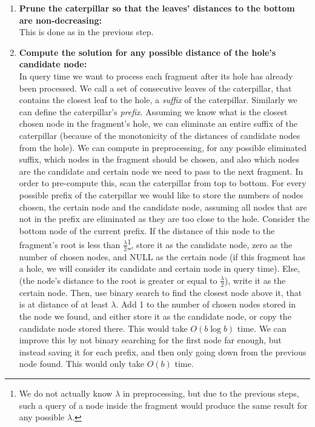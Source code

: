 \documentclass[11pt,a4paper]{article}
\theoremstyle{definition}
\theoremstyle{remark}
\begin{document}
\begin{enumerate}
\item \label{making distances from the hole monotone}
\textbf{Prune the caterpillar so that the leaves' distances to the bottom are non-decreasing:}\\
This is done as in the previous step.
\item\textbf{Compute the solution for any possible distance of the hole's candidate node:}\\
In query time we want to process each fragment after its hole has already been processed.
We call a set of consecutive leaves of the caterpillar, that contains the closest leaf to the hole, a \emph{suffix} of the caterpillar. Similarly we can define the caterpillar's \emph{prefix}.
Assuming we know what is the closest chosen node in the fragment's hole, we can eliminate an entire suffix of the caterpillar (because of the monotonicity of the distances of candidate nodes from the hole). We can compute in preprocessing, for any possible eliminated suffix, which nodes in the fragment should be chosen, and also which nodes are the candidate and certain node we need to pass to the next fragment.
In order to pre-compute this, scan the caterpillar from top to bottom. For every possible prefix of the caterpillar we would like to store the numbers of nodes chosen, the certain node and the candidate node, assuming all nodes that are not in the prefix are eliminated as they are too close to the hole. Consider the bottom node of the current prefix. If the distance of this node to the fragment's root is less than $\frac{\lambda}{2}$\footnote{We do not actually know $\lambda$ in preprocessing, but due to the previous steps, such a query of a node inside the fragment would produce the same result for any possible $\lambda$.}, store it as the candidate node, zero as the number of chosen nodes, and NULL as the certain node (if this fragment has a hole, we will consider its candidate and certain node in query time). Else, (the node's distance to the root is greater or equal to $\frac{\lambda}{2}$), write it as the certain node. Then, use binary search to find the closest node above it, that is at distance of at least $\lambda$. Add 1 to the number of chosen nodes stored in the node we found, and either store it as the candidate node, or copy the candidate node stored there. This would take $O(b \log b)$ time. We can improve this by not binary searching for the first node far enough, but instead saving it for each prefix, and then only going down from the previous node found. This would only take $O(b)$ time.
\end{enumerate}
\end{document}
